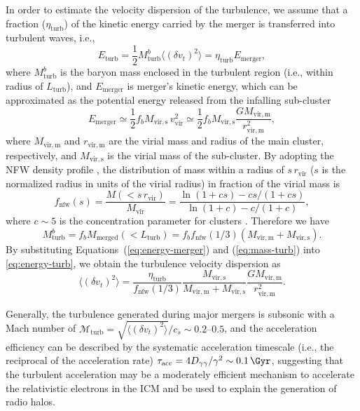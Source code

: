 \documentclass[modern]{aastex62}
\newcommand{\R}[1]{\mathrm{#1}}
\begin{document}
In order to estimate the velocity dispersion of the turbulence, we assume
that a fraction ($\eta_{\R{turb}}$) of the kinetic energy carried by the
merger is transferred into turbulent waves, i.e.,
\begin{equation}
  \label{eq:energy-turb}
  E_{\R{turb}} = \frac{1}{2} M_{\R{turb}}^b
    \langle (\delta{v_t})^2 \rangle = \eta_{\R{turb}} E_{\R{merger}},
\end{equation}
where
$M_{\R{turb}}^b$ is the baryon mass enclosed in the turbulent region
(i.e., within radius of $L_{\R{turb}}$),
and $E_{\R{merger}}$ is merger's kinetic energy, which can be approximated
as the potential energy released from the infalling sub-cluster
\begin{equation}
  \label{eq:energy-merger}
  E_{\R{merger}} \simeq \frac{1}{2} f_b M_{\R{vir,s}} \,v^2_{\R{vir}}
    \simeq \frac{1}{2} f_b M_{\R{vir,s}}
    \frac{G M_{\R{vir,m}}}{r^2_{\R{vir,m}}},
\end{equation}
where
$M_{\R{vir,m}}$ and $r_{\R{vir,m}}$ are the virial mass and radius of the
main cluster, respectively, and $M_{\R{vir,s}}$ is the virial mass of the
sub-cluster.
By adopting the NFW density profile \citep{navarro1997}, the distribution
of mass within a radius of $s \,r_{\R{vir}}$ ($s$ is the normalized radius
in units of the virial radius) in fraction of the virial mass is
\begin{equation}
  \label{eq:mass-dist-nfw}
  f_{\R{nfw}}(s) = \frac{M(< s \,r_{\R{vir}})}{M_{\R{vir}}} =
    \frac{\ln(1 + c s) - c s / (1 + c s)}{\ln(1 + c) - c / (1 + c)},
\end{equation}
where
$c \sim 5$ is the concentration parameter for clusters \citep{lokas2001}.
Therefore we have
\begin{equation}
  \label{eq:mass-turb}
  M_{\R{turb}}^b = f_b M_{\R{merged}}(<L_{\R{turb}})
    = f_b f_{\R{nfw}}(1/3) (M_{\R{vir,m}} + M_{\R{vir,s}}).
\end{equation}
By substituting Equations~(\ref{eq:energy-merger}) and (\ref{eq:mass-turb})
into \autoref{eq:energy-turb}, we obtain the turbulence velocity dispersion
as
\begin{equation}
  \label{eq:turb-velocity-dispersion}
  \langle (\delta{v_t})^2 \rangle =
    \frac{\eta_{\R{turb}}}{f_{\R{nfw}}(1/3)}
    \frac{M_{\R{vir,s}}}{M_{\R{vir,m}} + M_{\R{vir,s}}}
    \frac{G M_{\R{vir,m}}}{r^2_{\R{vir,m}}}.
\end{equation}

Generally, the turbulence generated during major mergers is subsonic
with a Mach number of
$\mathcal{M}_{\R{turb}} = \sqrt{\langle (\delta{v_t})^2 \rangle} / c_s
  \sim \numrange{0.2}{0.5}$,
and the acceleration efficiency can be described by the systematic
acceleration timescale (i.e., the reciprocal of the acceleration rate)
$\tau_{\R{acc}} = 4 D_{\gamma\gamma} / \gamma^2 \sim \SI{0.1}{\Gyr}$,
suggesting that the turbulent acceleration may be a moderately efficient
mechanism to accelerate the relativistic electrons in the ICM and be used
to explain the generation of radio halos.
\end{document}
